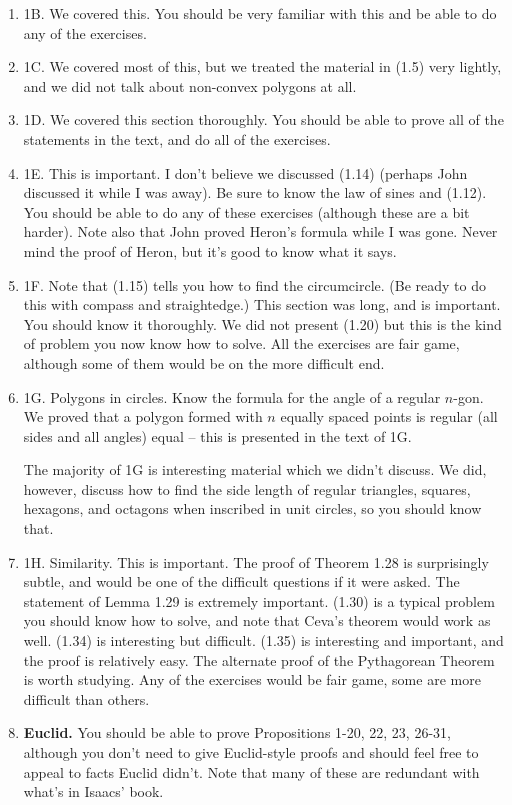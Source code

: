 \documentclass[12pt]{article}
\begin{document}
\begin{enumerate}[(1)]
\item 1B. We covered this. You should be very familiar with this and be able to do any of the exercises.
\item 1C. We covered most of this, but we treated the material in (1.5) very lightly, and we did not talk about
non-convex polygons at all. 
\item 1D. We covered this section thoroughly. You should be able to prove all of the statements in the text,
and do all of the exercises.
\item 1E. This is important. I don't believe we discussed (1.14) (perhaps John discussed it while I was away).
Be sure to know the law of sines and (1.12). You should be able to do any of these exercises (although these are a
bit harder). Note also that John proved Heron's formula while I was gone. Never mind the proof of Heron, but it's good
to know what it says.
\item 1F. Note that (1.15) tells you how to find the circumcircle. (Be ready to do this with compass and straightedge.)
This section was long, and is important. You should know it thoroughly. We did not present (1.20) but this is the kind
of problem you now know how to solve. All the exercises are fair game, although some of them would be on the more difficult
end.
\item 1G. Polygons in circles. Know the formula for the angle of a regular $n$-gon. We proved that a polygon formed with
$n$ equally spaced points is regular (all sides and all angles) equal -- this is presented in the text of 1G.

The majority of 1G is interesting material which we didn't discuss. We did, however, discuss how to find the side length
of regular triangles, squares, hexagons, and octagons when inscribed in unit circles, so you should know that.
\item 1H. Similarity. This is important. The proof of Theorem 1.28 is surprisingly subtle, and would be one of the difficult
questions if it were asked. The statement of Lemma 1.29 is extremely important. (1.30) is a typical problem you should know
how to solve, and note that Ceva's theorem would work as well. (1.34) is interesting but difficult. (1.35) is interesting and
important, and the proof is relatively easy. The alternate proof of the Pythagorean Theorem is worth studying. Any of the
exercises would be fair game, some are more difficult than others.

\item {\bf Euclid.} You should be able to prove Propositions 1-20, 22, 23, 26-31, although you don't need to give
Euclid-style proofs and should feel free to appeal to facts Euclid didn't. Note that many of these are redundant with
what's in Isaacs' book.


\end{enumerate}
\end{document}
